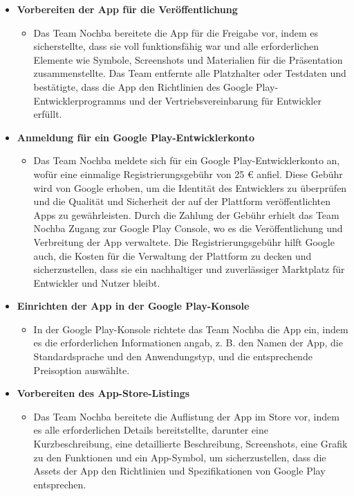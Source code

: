 \begin{itemize}
    \item \textbf{Vorbereiten der App für die Veröffentlichung}
    \begin{itemize}
        \item {Das Team Nochba bereitete die App für die Freigabe vor, indem es sicherstellte, dass sie voll funktionsfähig war und alle erforderlichen Elemente wie Symbole, Screenshots und Materialien für die Präsentation zusammenstellte. Das Team entfernte alle Platzhalter oder Testdaten und bestätigte, dass die App den Richtlinien des Google Play-Entwicklerprogramms und der Vertriebsvereinbarung für Entwickler erfüllt.}
    \end{itemize}
    \item \textbf{Anmeldung für ein Google Play-Entwicklerkonto}
    \begin{itemize}
        \item {Das Team Nochba meldete sich für ein Google Play-Entwicklerkonto an, wofür eine einmalige Registrierungsgebühr von 25 € anfiel. Diese Gebühr wird von Google erhoben, um die Identität des Entwicklers zu überprüfen und die Qualität und Sicherheit der auf der Plattform veröffentlichten Apps zu gewährleisten. Durch die Zahlung der Gebühr erhielt das Team Nochba Zugang zur Google Play Console, wo es die Veröffentlichung und Verbreitung der App verwaltete. Die Registrierungsgebühr hilft Google auch, die Kosten für die Verwaltung der Plattform zu decken und sicherzustellen, dass sie ein nachhaltiger und zuverlässiger Marktplatz für Entwickler und Nutzer bleibt.}
    \end{itemize}
    \item \textbf{Einrichten der App in der Google Play-Konsole}
    \begin{itemize}
        \item {In der Google Play-Konsole richtete das Team Nochba die App ein, indem es die erforderlichen Informationen angab, z. B. den Namen der App, die Standardsprache und den Anwendungstyp, und die entsprechende Preisoption auswählte.}
    \end{itemize}
    \item \textbf{Vorbereiten des App-Store-Listings}
    \begin{itemize}
        \item {Das Team Nochba bereitete die Auflistung der App im Store vor, indem es alle erforderlichen Details bereitstellte, darunter eine Kurzbeschreibung, eine detaillierte Beschreibung, Screenshots, eine Grafik zu den Funktionen und ein App-Symbol, um sicherzustellen, dass die Assets der App den Richtlinien und Spezifikationen von Google Play entsprechen.}

\end{itemize}
\end{itemize}

